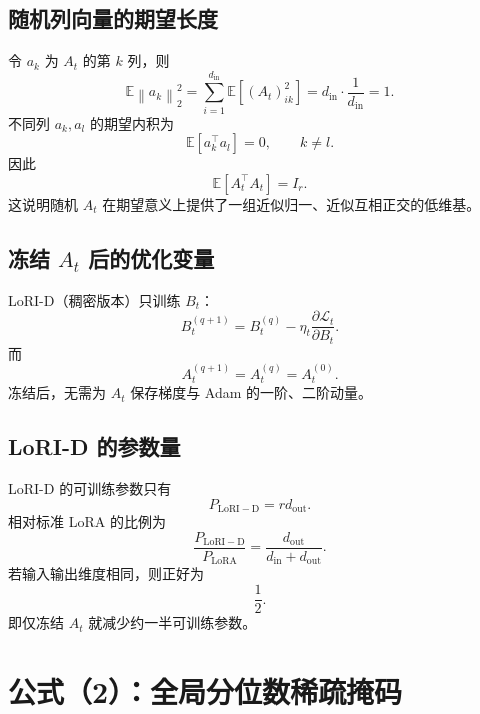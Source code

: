 \documentclass[UTF8,12pt,a4paper,fontset=none]{ctexart}
\numberwithin{equation}{section}
\newcommand{\E}{\mathbb{E}}
\newcommand{\norm}[1]{\left\lVert #1\right\rVert}
\newcommand{\Loss}{\mathcal{L}}
\begin{document}
\subsection{随机列向量的期望长度}

令 $a_k$ 为 $A_t$ 的第 $k$ 列，则
\begin{equation}
  \E\norm{a_k}_2^2
  =\sum_{i=1}^{d_{\mathrm{in}}}\E[(A_t)_{ik}^2]
  =d_{\mathrm{in}}\cdot\frac{1}{d_{\mathrm{in}}}=1.
\end{equation}
不同列 $a_k,a_l$ 的期望内积为
\begin{equation}
  \E[a_k^{\top}a_l]=0,\qquad k\neq l.
\end{equation}
因此
\begin{equation}
  \E[A_t^{\top}A_t]=I_r.
  \label{eq:ata-expect}
\end{equation}
这说明随机 $A_t$ 在期望意义上提供了一组近似归一、近似互相正交的低维基。

\subsection{冻结 \texorpdfstring{$A_t$}{A t} 后的优化变量}

LoRI-D（稠密版本）只训练 $B_t$：
\begin{equation}
  B_t^{(q+1)}
  =B_t^{(q)}-\eta_t
  \frac{\partial\Loss_t}{\partial B_t}.
\end{equation}
而
\begin{equation}
  A_t^{(q+1)}=A_t^{(q)}=A_t^{(0)}.
\end{equation}
冻结后，无需为 $A_t$ 保存梯度与 Adam 的一阶、二阶动量。

\subsection{LoRI-D 的参数量}

LoRI-D 的可训练参数只有
\begin{equation}
  P_{\mathrm{LoRI-D}}=rd_{\mathrm{out}}.
\end{equation}
相对标准 LoRA 的比例为
\begin{equation}
  \frac{P_{\mathrm{LoRI-D}}}{P_{\mathrm{LoRA}}}
  =\frac{d_{\mathrm{out}}}{d_{\mathrm{in}}+d_{\mathrm{out}}}.
\end{equation}
若输入输出维度相同，则正好为
\begin{equation}
  \frac{1}{2}.
\end{equation}
即仅冻结 $A_t$ 就减少约一半可训练参数。

\section{公式（2）：全局分位数稀疏掩码}
\end{document}
